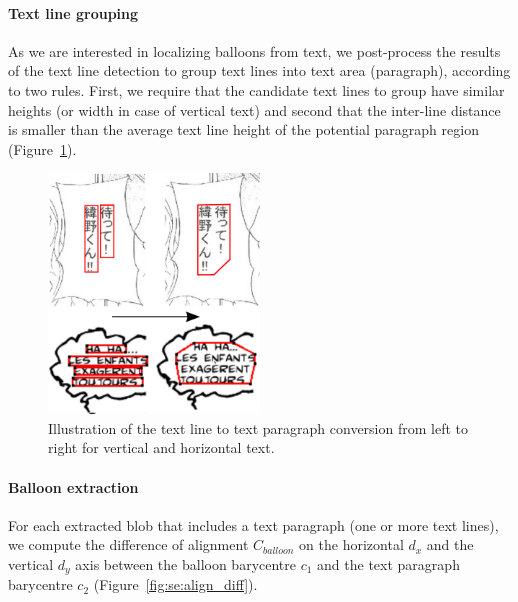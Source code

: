 
\paragraph{Text line grouping} %
\label{par:text_line_grouping}

As we are interested in localizing balloons from text, we post-process the results of the text line detection to group text lines into text area (paragraph), according to two rules.
First, we require that the candidate text lines to group have similar heights (or width in case of vertical text) and second that the inter-line distance is smaller than the average text line height of the potential paragraph region (Figure~\ref{fig:se:line_to_paragraphs}).

	\begin{figure}[h!]	%
	  \centering
		\includegraphics[trim= 0px 0px 0px 0px, clip, width=0.5\textwidth]{line_to_paragraphs.pdf}
		\caption[Text line to text paragraph conversion illustration]{Illustration of the text line to text paragraph conversion from left to right for vertical and horizontal text.}
		\label{fig:se:line_to_paragraphs}
	\end{figure}


\paragraph{Balloon extraction} %
\label{par:balloon_extraction}

For each extracted blob that includes a text paragraph (one or more text lines), we compute the difference of alignment $C_{balloon}$ on the horizontal $d_x$ and the vertical $d_y$ axis between the balloon barycentre $c_1$ and the text paragraph barycentre $c_2$ (Figure~\ref{fig:se:align_diff}).

